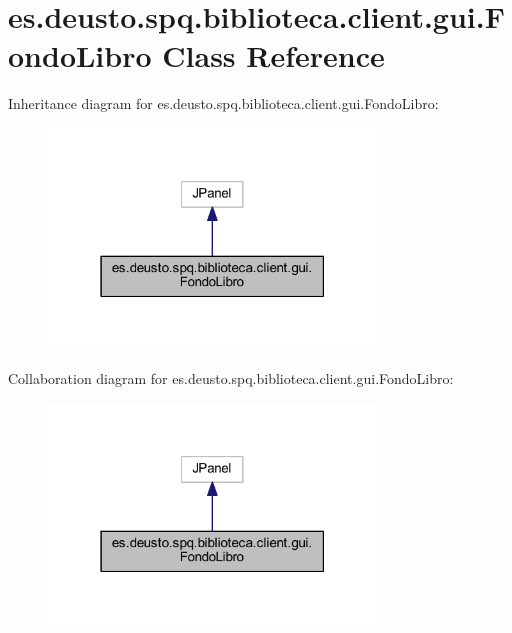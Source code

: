 \hypertarget{classes_1_1deusto_1_1spq_1_1biblioteca_1_1client_1_1gui_1_1_fondo_libro}{}\section{es.\+deusto.\+spq.\+biblioteca.\+client.\+gui.\+Fondo\+Libro Class Reference}
\label{classes_1_1deusto_1_1spq_1_1biblioteca_1_1client_1_1gui_1_1_fondo_libro}


Inheritance diagram for es.\+deusto.\+spq.\+biblioteca.\+client.\+gui.\+Fondo\+Libro\+:
\nopagebreak
\begin{figure}[H]
\begin{center}
\leavevmode
\includegraphics[width=247pt]{classes_1_1deusto_1_1spq_1_1biblioteca_1_1client_1_1gui_1_1_fondo_libro__inherit__graph}
\end{center}
\end{figure}


Collaboration diagram for es.\+deusto.\+spq.\+biblioteca.\+client.\+gui.\+Fondo\+Libro\+:
\nopagebreak
\begin{figure}[H]
\begin{center}
\leavevmode
\includegraphics[width=247pt]{classes_1_1deusto_1_1spq_1_1biblioteca_1_1client_1_1gui_1_1_fondo_libro__coll__graph}
\end{center}
\end{figure}
